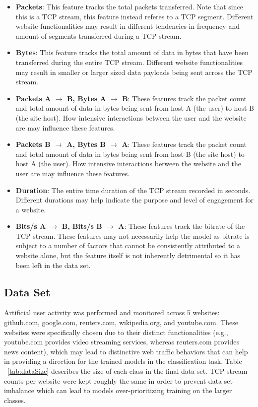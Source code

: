 \documentclass[10pt,sigconf,letterpaper,nonacm]{acmart}
\begin{document}
\begin{itemize}
  \item \textbf{Packets}: This feature tracks the total packets transferred. Note that since this is a TCP stream, this feature instead referes to a TCP segment. Different website functionalities may result in different tendencies in frequency and amount of segments transferred during a TCP stream.
  
  \item \textbf{Bytes}: This feature tracks the total amount of data in bytes that have been transferred during the entire TCP stream. Different website functionalities may result in smaller or larger sized data payloads being sent across the TCP stream.
  
  \item \textbf{Packets A $\rightarrow$ B, Bytes A $\rightarrow$ B}: These features track the packet count and total amount of data in bytes being sent from host A (the user) to host B (the site host). How intensive interactions between the user and the website are may influence these features.
  
  \item \textbf{Packets B $\rightarrow$ A, Bytes B $\rightarrow$ A}: These features track the packet count and total amount of data in bytes being sent from host B (the site host) to host A (the user). How intensive interactions between the website and the user are may influence these features.
  
  \item \textbf{Duration}: The entire time duration of the TCP stream recorded in seconds. Different durations may help indicate the purpose and level of engagement for a website.
  
  \item \textbf{Bits/s A $\rightarrow$ B, Bits/s B $\rightarrow$ A}: These features track the bitrate of the TCP stream. These features may not necessarily help the model as bitrate is subject to a number of factors that cannot be consistently attributed to a website alone, but the feature itself is not inherently detrimental so it has been left in the data set.
\end{itemize}

\subsection{Data Set}

Artificial user activity was performed and monitored across 5 websites: github.com, google.com, reuters.com, wikipedia.org, and youtube.com.
These websites were specifically chosen due to their distinct functionalities (e.g., youtube.com provides video streaming services, whereas reuters.com provides news content), which may lead to distinctive web traffic behaviors that can help in providing a direction for the trained models in the classification task.
Table ~\ref{tab:dataSize} describes the size of each class in the final data set.
TCP stream counts per website were kept roughly the same in order to prevent data set imbalance which can lead to models over-prioritizing training on the larger classes.
\end{document}
